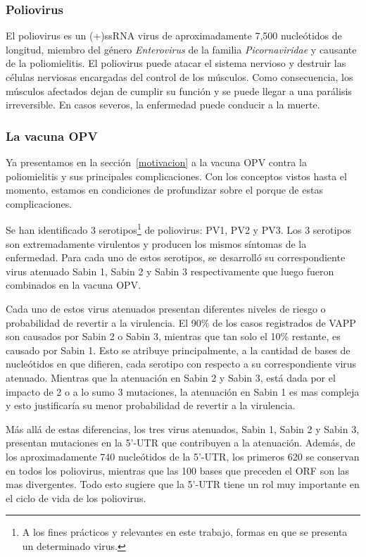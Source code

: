 \subsubsection{Poliovirus}

El poliovirus es un \ac{(+)ssRNA virus} de aproximadamente 7,500 nucle\'otidos
de longitud, miembro del g\'enero \textit{Enterovirus} de la familia
\textit{Picornaviridae} y causante de la poliomielitis. El poliovirus puede
atacar el sistema nervioso y destruir las c\'elulas nerviosas encargadas del
control de los m\'usculos. Como consecuencia, los m\'usculos afectados dejan de
cumplir su funci\'on y se puede llegar a una par\'alisis irreversible. En casos
severos, la enfermedad puede conducir a la muerte.

\subsubsection{La vacuna \ac{OPV}}

Ya presentamos en la secci\'on~\ref{motivacion} a la vacuna \ac{OPV} contra la
poliomielitis y sus principales complicaciones. Con los conceptos vistos
hasta el momento, estamos en condiciones de profundizar sobre el
porque de estas complicaciones.

Se han identificado 3 serotipos\footnote{A los fines pr\'acticos y relevantes en
este trabajo, formas en que se presenta un determinado virus.} de poliovirus:
\ac{PV1}, \ac{PV2} y \ac{PV3}. Los 3 serotipos son extremadamente virulentos y
producen los mismos s\'intomas de la enfermedad. Para cada uno de estos
serotipos, se desarroll\'o  su correspondiente virus atenuado Sabin 1, Sabin 2 y
Sabin 3 respectivamente que luego fueron combinados en la vacuna \ac{OPV}.

Cada uno de estos virus atenuados presentan diferentes niveles de riesgo o
probabilidad de revertir a la virulencia. El 90\% de los casos registrados de
\ac{VAPP} son causados por Sabin 2 o Sabin 3, mientras que tan solo el 10\%
restante, es causado por Sabin 1\cite{Philip92}. Esto se atribuye
principalmente, a la cantidad de bases de nucle\'otidos en que difieren, cada
serotipo con respecto a su correspondiente virus atenuado. Mientras que la
atenuaci\'on en Sabin 2 y Sabin 3, est\'a dada por el impacto de 2
o a lo sumo 3 mutaciones, la atenuaci\'on en Sabin 1 es mas compleja y esto
justificar\'ia su menor probabilidad de revertir a la virulencia\cite{Philip92}.

M\'as all\'a de estas diferencias, los tres virus atenuados, Sabin 1, Sabin 2 y
Sabin 3, presentan mutaciones en la 5'-\ac{UTR} que contribuyen a la
atenuaci\'on. Adem\'as, de los aproximadamente 740 nucle\'otidos de la
5'-\ac{UTR}, los primeros 620 se conservan en todos los poliovirus, mientras que
las 100 bases que preceden el \ac{ORF} son las mas divergentes. Todo esto
sugiere que la 5'-\ac{UTR} tiene un rol muy importante en el ciclo de vida de
los poliovirus\cite{Philip92}.

